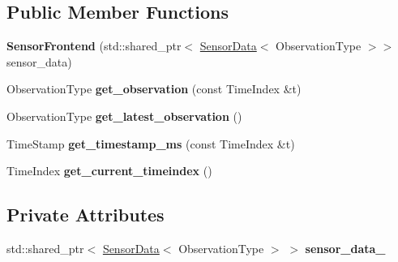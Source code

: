 \subsection*{Public Member Functions}
\begin{DoxyCompactItemize}
\item 
{\bfseries Sensor\+Frontend} (std\+::shared\+\_\+ptr$<$ \hyperlink{classrobot__interfaces_1_1SensorData}{Sensor\+Data}$<$ Observation\+Type $>$$>$ sensor\+\_\+data)\hypertarget{classrobot__interfaces_1_1SensorFrontend_a87a137bd1903267ab407718ecc8375de}{}\label{classrobot__interfaces_1_1SensorFrontend_a87a137bd1903267ab407718ecc8375de}

\item 
Observation\+Type {\bfseries get\+\_\+observation} (const Time\+Index \&t)\hypertarget{classrobot__interfaces_1_1SensorFrontend_a5cd0e27368bdd233f1d4091448244330}{}\label{classrobot__interfaces_1_1SensorFrontend_a5cd0e27368bdd233f1d4091448244330}

\item 
Observation\+Type {\bfseries get\+\_\+latest\+\_\+observation} ()\hypertarget{classrobot__interfaces_1_1SensorFrontend_adb8f1281c2cfc36c371e9538bd030bf4}{}\label{classrobot__interfaces_1_1SensorFrontend_adb8f1281c2cfc36c371e9538bd030bf4}

\item 
Time\+Stamp {\bfseries get\+\_\+timestamp\+\_\+ms} (const Time\+Index \&t)\hypertarget{classrobot__interfaces_1_1SensorFrontend_a5b5e173a9322758e29002e5a6f536edb}{}\label{classrobot__interfaces_1_1SensorFrontend_a5b5e173a9322758e29002e5a6f536edb}

\item 
Time\+Index {\bfseries get\+\_\+current\+\_\+timeindex} ()\hypertarget{classrobot__interfaces_1_1SensorFrontend_aa1eeffc227854dc5fdede71dd04bcaa6}{}\label{classrobot__interfaces_1_1SensorFrontend_aa1eeffc227854dc5fdede71dd04bcaa6}

\end{DoxyCompactItemize}
\subsection*{Private Attributes}
\begin{DoxyCompactItemize}
\item 
std\+::shared\+\_\+ptr$<$ \hyperlink{classrobot__interfaces_1_1SensorData}{Sensor\+Data}$<$ Observation\+Type $>$ $>$ {\bfseries sensor\+\_\+data\+\_\+}\hypertarget{classrobot__interfaces_1_1SensorFrontend_a19b1505aed15c8e8e62c47e5de37d27f}{}\label{classrobot__interfaces_1_1SensorFrontend_a19b1505aed15c8e8e62c47e5de37d27f}

\end{DoxyCompactItemize}


